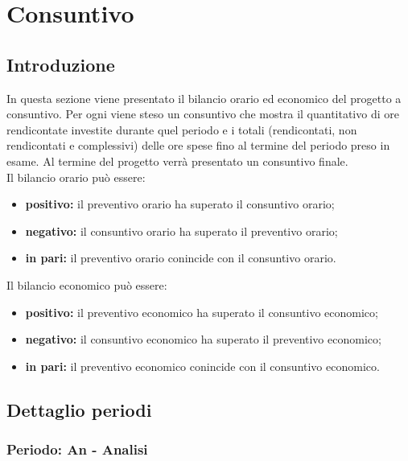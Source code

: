 
\section {Consuntivo}
	\subsection {Introduzione}
	In questa sezione viene presentato il bilancio orario ed economico del progetto a consuntivo. Per ogni  viene steso un consuntivo che mostra il quantitativo di ore rendicontate investite durante quel periodo e i totali (rendicontati, non rendicontati e complessivi) delle ore spese fino al termine del periodo preso in esame. Al termine del progetto verrà presentato un consuntivo finale.
	\\Il bilancio orario può essere:
	\begin{itemize}
	\item \textbf{positivo:} il preventivo orario ha superato il consuntivo orario;
	\item \textbf{negativo:} il consuntivo orario ha superato il preventivo orario;
	\item \textbf{in pari:} il preventivo orario conincide con il consuntivo orario.
	\end{itemize}
	Il bilancio economico può essere:
	\begin{itemize}
	\item \textbf{positivo:} il preventivo economico ha superato il consuntivo economico;
	\item \textbf{negativo:} il consuntivo economico ha superato il preventivo economico;
	\item \textbf{in pari:}  il preventivo economico conincide con il consuntivo economico.
	\end{itemize}
	
	\newpage
	\subsection {Dettaglio periodi}
		\subsubsection {Periodo: An - Analisi}
